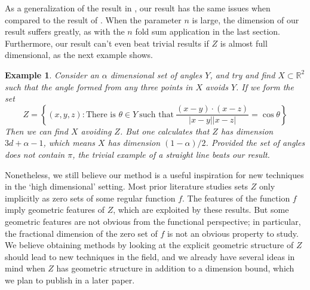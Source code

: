 \documentclass[usenames,dvipsnames,letterpaper, reqno,11pt]{article}
\theoremstyle{plain}
\newtheorem*{example}{Example}
\theoremstyle{plain}
\newcommand{\RR}{\mathbb{R}}
\begin{document}
As a generalization of the result in \cite{MalabikaRob}, our result has the same issues when compared to the result of \cite{Mathe}. When the parameter $n$ is large, the dimension of our result suffers greatly, as with the $n$ fold sum application in the last section. Furthermore, our result can't even beat trivial results if $Z$ is almost full dimensional, as the next example shows.

\begin{example}
	Consider an $\alpha$ dimensional set of angles $Y$, and try and find $X \subset \RR^2$ such that the angle formed from any three points in $X$ avoids $Y$. If we form the set
	\[ Z = \left\{ (x,y,z): \text{There is $\theta \in Y$}\ \text{such that}\ \frac{(x - y) \cdot (x - z)}{|x - y||x - z|} = \cos \theta \right\} \]
	Then we can find $X$ avoiding $Z$. But one calculates that $Z$ has dimension $3d + \alpha - 1$, which means $X$ has dimension $(1 - \alpha) / 2$. Provided the set of angles does not contain $\pi$, the trivial example of a straight line beats our result.
\end{example}

Nonetheless, we still believe our method is a useful inspiration for new techniques in the `high dimensional' setting. Most prior literature studies sets $Z$ only implicitly as zero sets of some regular function $f$. The features of the function $f$ imply geometric features of $Z$, which are exploited by these results. But some geometric features are not obvious from the functional perspective; in particular, the fractional dimension of the zero set of $f$ is not an obvious property to study. We believe obtaining methods by looking at the explicit geometric structure of $Z$ should lead to new techniques in the field, and we already have several ideas in mind when $Z$ has geometric structure in addition to a dimension bound, which we plan to publish in a later paper.




\end{document}
